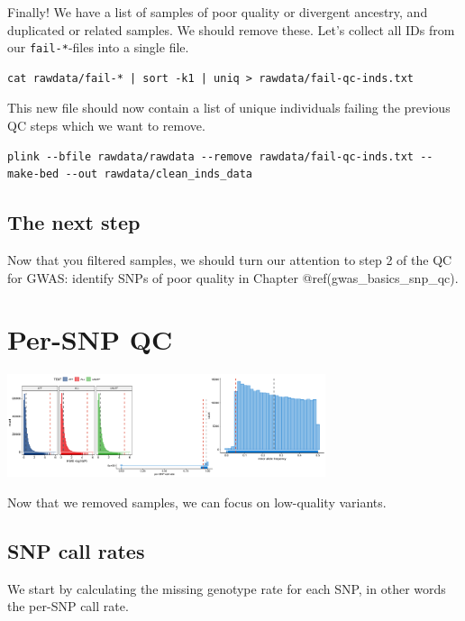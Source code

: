 \documentclass[
]{book}
\begin{document}
Finally! We have a list of samples of poor quality or divergent ancestry, and duplicated or related samples. We should remove these. Let's collect all IDs from our \texttt{fail-*}-files into a single file.

\begin{verbatim}
cat rawdata/fail-* | sort -k1 | uniq > rawdata/fail-qc-inds.txt
\end{verbatim}

This new file should now contain a list of unique individuals failing the previous QC steps which we want to remove.

\begin{verbatim}
plink --bfile rawdata/rawdata --remove rawdata/fail-qc-inds.txt --make-bed --out rawdata/clean_inds_data
\end{verbatim}

\hypertarget{the-next-step}{%
\section{The next step}\label{the-next-step}}

Now that you filtered samples, we should turn our attention to step 2 of the QC for GWAS: identify SNPs of poor quality in Chapter @ref(gwas\_basics\_snp\_qc).

\hypertarget{gwas_basics_snp_qc}{%
\chapter{Per-SNP QC}\label{gwas_basics_snp_qc}}

\includegraphics[width=0.7\textwidth,height=\textheight]{img/gwas_snp_qc.png}

Now that we removed samples, we can focus on low-quality variants.

\hypertarget{snp-call-rates}{%
\section{SNP call rates}\label{snp-call-rates}}

We start by calculating the missing genotype rate for each SNP, in other words the per-SNP call rate.
\end{document}
